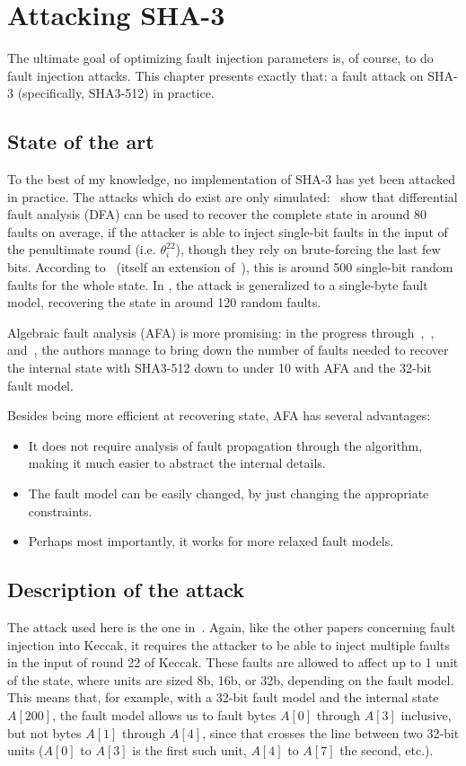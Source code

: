 \documentclass[times, utf8, diplomski]{fer}
\begin{document}
\chapter{Attacking SHA-3}\label{ch:attacking_keccak}
The ultimate goal of optimizing fault injection parameters is, of course, to
do fault injection attacks. This chapter presents exactly that: a fault attack
on SHA-3 (specifically, SHA3-512) in practice.

\section{State of the art}
To the best of my knowledge, no implementation of SHA-3 has yet been attacked in
practice. The attacks which do exist are only simulated:~\cite{DFA_SHA-3_single-bit}
show that differential fault analysis (DFA) can be used to recover the complete
state in around 80 faults on average, if the attacker is able to inject single-bit
faults in the input of the penultimate round (i.e. $\theta^{22}_i$), though they
rely on brute-forcing the last few bits. According to~\cite{luo2017relaxed}
(itself an extension of~\cite{luo2016shortSHA3}), this is around 500 single-bit
random faults for the whole state. In \cite{luo2017relaxed}, the attack is
generalized to a single-byte fault model, recovering the state in around 120
random faults.

Algebraic fault analysis (AFA) is more promising: in the progress
through~\cite{luo2016shortSHA3},~\cite{luo2017relaxed}, and~\cite{luo2018algebraic},
the authors manage to bring down the number of faults needed to recover the
internal state with SHA3-512 down to under 10 with AFA and the 32-bit fault
model.

Besides being more efficient at recovering state, AFA has several advantages:
\begin{itemize}
 \item It does not require analysis of fault propagation through the algorithm,
       making it much easier to abstract the internal details.
 \item The fault model can be easily changed, by just changing the appropriate constraints.
 \item Perhaps most importantly, it works for more relaxed fault models.
\end{itemize}


\section{Description of the attack}
The attack used here is the one in~\cite{luo2018algebraic}.
Again, like the other papers concerning fault injection into Keccak, it requires
the attacker to be able to inject multiple faults in the input of round 22 of Keccak.
These faults are allowed to affect up to 1 unit of the state, where units are sized
8b, 16b, or 32b, depending on the fault model. This means that, for example, with
a 32-bit fault model and the internal state $A[200]$, the fault model allows us
to fault bytes $A[0]$ through $A[3]$ inclusive, but not bytes $A[1]$ through $A[4]$,
since that crosses the line between two 32-bit units ($A[0]$ to $A[3]$ is the first
such unit, $A[4]$ to $A[7]$ the second, etc.).
\end{document}
